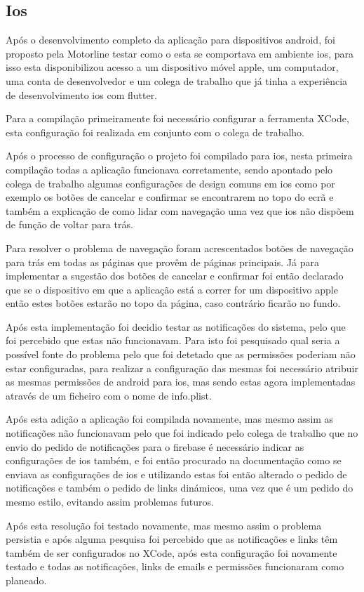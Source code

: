 \subsection{Ios}
Após o desenvolvimento completo da aplicação para dispositivos android, foi proposto pela Motorline testar como o esta se comportava em ambiente ios, para isso esta disponibilizou acesso a um dispositivo móvel apple, um computador, uma conta de desenvolvedor e um colega de trabalho que já tinha a experiência de desenvolvimento ios com flutter.

Para a compilação primeiramente foi necessário configurar a ferramenta XCode, esta configuração foi realizada em conjunto com o colega de trabalho.

Após o processo de configuração o projeto foi compilado para ios, nesta primeira compilação todas a aplicação funcionava corretamente, sendo apontado pelo colega de trabalho algumas configurações de design comuns em ios como por exemplo os botões de cancelar e confirmar se encontrarem no topo do ecrã e também a explicação de como lidar com navegação uma vez que ios não dispõem de função de voltar para trás.

Para resolver o problema de navegação foram acrescentados botões de navegação para trás em todas as páginas que provêm de páginas principais. Já para implementar a sugestão dos botões de cancelar e confirmar foi então declarado que se o dispositivo em que a aplicação está a correr for um dispositivo apple então estes botões estarão no topo da página, caso contrário ficarão no fundo.

Após esta implementação foi decidio testar as notificações do sistema, pelo que foi percebido que estas não funcionavam. Para isto foi pesquisado qual seria a possível fonte do problema pelo que foi detetado que as permissões poderiam não estar configuradas, para realizar a configuração das mesmas foi necessário atribuir as mesmas permissões de android para ios, mas sendo estas agora implementadas através de um ficheiro com o nome de info.plist.

Após esta adição a aplicação foi compilada novamente, mas mesmo assim as notificações não funcionavam pelo que foi indicado pelo colega de trabalho que no envio do pedido de notificações para o firebase é necessário indicar as configurações de ios também, e foi então procurado na documentação como se enviava as configurações de ios e utilizando estas foi então alterado o pedido de notificações e também o pedido de links dinámicos, uma vez que é um pedido do mesmo estilo, evitando assim problemas futuros.

Após esta resolução foi testado novamente, mas mesmo assim o problema persistia e após alguma pesquisa foi percebido que as notificações e links têm também de ser configurados no XCode, após esta configuração foi novamente testado e todas as notificações, links de emails e permissões funcionaram como planeado.